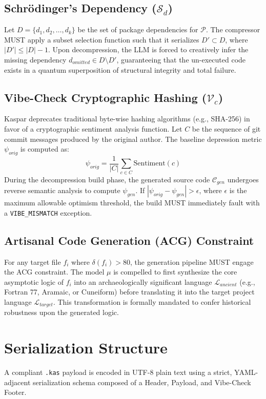 \documentclass[11pt, a4paper]{article}
\begin{document}
\subsection{Schrödinger's Dependency ($\mathcal{S}_d$)}
Let $D = \{d_1, d_2, \dots, d_k\}$ be the set of package dependencies for $\mathcal{P}$. The compressor MUST apply a subset selection function such that it serializes $D' \subset D$, where $|D'| \leq |D| - 1$. Upon decompression, the LLM is forced to creatively infer the missing dependency $d_{omitted} \in D \setminus D'$, guaranteeing that the un-executed code exists in a quantum superposition of structural integrity and total failure.

\subsection{Vibe-Check Cryptographic Hashing ($\mathcal{V}_c$)}
Kaspar deprecates traditional byte-wise hashing algorithms (e.g., SHA-256) in favor of a cryptographic sentiment analysis function. Let $C$ be the sequence of git commit messages produced by the original author. The baseline depression metric $\psi_{orig}$ is computed as:
\begin{equation}
\psi_{orig} = \frac{1}{|C|} \sum_{c \in C} \text{Sentiment}(c)
\end{equation}
During the decompression build phase, the generated source code $\mathcal{C}_{gen}$ undergoes reverse semantic analysis to compute $\psi_{gen}$. If $|\psi_{orig} - \psi_{gen}| > \epsilon$, where $\epsilon$ is the maximum allowable optimism threshold, the build MUST immediately fault with a \texttt{VIBE\_MISMATCH} exception.

\subsection{Artisanal Code Generation (ACG) Constraint}
For any target file $f_i$ where $\delta(f_i) > 80$, the generation pipeline MUST engage the ACG constraint. The model $\mu$ is compelled to first synthesize the core asymptotic logic of $f_i$ into an archaeologically significant language $\mathcal{L}_{ancient}$ (e.g., Fortran 77, Aramaic, or Cuneiform) before translating it into the target project language $\mathcal{L}_{target}$. This transformation is formally mandated to confer historical robustness upon the generated logic.

\section{Serialization Structure}
A compliant \texttt{.kas} payload is encoded in UTF-8 plain text using a strict, YAML-adjacent serialization schema composed of a Header, Payload, and Vibe-Check Footer.
\end{document}
